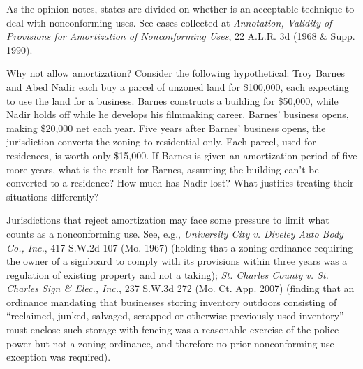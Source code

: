 \item
As the opinion notes, states are divided on whether  is an
acceptable technique to deal with nonconforming uses. See cases collected at
\emph{Annotation, Validity of Provisions for Amortization of Nonconforming
Uses}, 22 A.L.R. 3d (1968 \& Supp. 1990). 

Why not allow amortization? Consider the following hypothetical: Troy Barnes and
Abed Nadir each buy a parcel of unzoned land for \$100,000, each expecting to
use the land for a business. Barnes constructs a building for \$50,000, while
Nadir holds off while he develops his filmmaking career. Barnes' business opens,
making \$20,000 net each year. Five years after Barnes' business opens, the
jurisdiction converts the zoning to residential only. Each parcel, used for
residences, is worth only \$15,000. If Barnes is given an amortization period of
five more years, what is the result for Barnes, assuming the building can't be
converted to a residence? How much has Nadir lost? What justifies treating their
situations differently?

\item
Jurisdictions that reject amortization may face some pressure to limit what
counts as a nonconforming use. See, e.g., \emph{University City v. Diveley Auto
Body Co., Inc.}, 417 S.W.2d 107 (Mo. 1967) (holding that a zoning ordinance
requiring the owner of a signboard to comply with its provisions within three
years was a regulation of existing property and not a taking); \emph{St. Charles
County v. St. Charles Sign \& Elec., Inc.}, 237 S.W.3d 272 (Mo. Ct. App. 2007)
(finding that an ordinance mandating that businesses storing inventory outdoors
consisting of ``reclaimed, junked, salvaged, scrapped or otherwise previously
used inventory'' must enclose such storage with fencing was a reasonable
exercise of the police power but not a zoning ordinance, and therefore no prior
nonconforming use exception was required).

